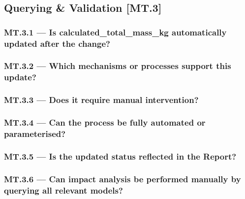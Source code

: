 \documentclass[sigconf,review]{acmart}
\begin{document}
\subsection{Querying \& Validation [MT.3]}
\label{sec:MT3}

\subsubsection*{MT.3.1 --- Is \textsf{calculated\_total\_mass\_kg} automatically updated after the change?}
\label{sec:MT3-1}



\subsubsection*{MT.3.2 --- Which mechanisms or processes support this update?}
\label{sec:MT3-2}



\subsubsection*{MT.3.3 --- Does it require manual intervention?}
\label{sec:MT3-3}



\subsubsection*{MT.3.4 --- Can the process be fully automated or parameterised?}
\label{sec:MT3-4}



\subsubsection*{MT.3.5 --- Is the updated status reflected in the Report?}
\label{sec:MT3-5}



\subsubsection*{MT.3.6 --- Can impact analysis be performed manually by querying all relevant models?}
\label{sec:MT3-6}
\end{document}
